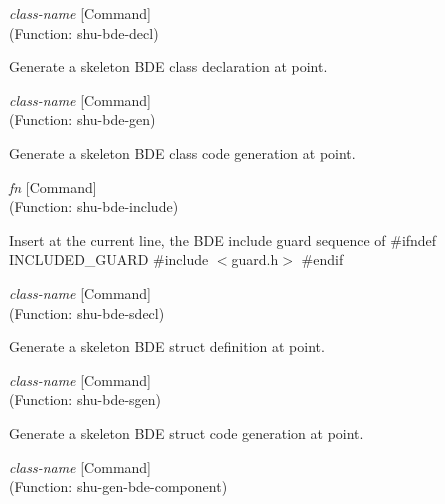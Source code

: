 \vspace{1em}
\noindent
{}
\usebox{\funcname}\emph{class-name}
 \hfill [Command]\\%
 (Function: shu-bde-decl)

\begin{doc-string}
Generate a skeleton BDE class declaration at point.
\end{doc-string}

\vspace{1em}
\noindent
{}
\usebox{\funcname}\emph{class-name}
 \hfill [Command]\\%
 (Function: shu-bde-gen)

\begin{doc-string}
Generate a skeleton BDE class code generation at point.
\end{doc-string}

\vspace{1em}
\noindent
{}
\usebox{\funcname}\emph{fn}
 \hfill [Command]\\%
 (Function: shu-bde-include)

\begin{doc-string}
Insert at the current line, the BDE include guard sequence of
\#ifndef INCLUDED\_GUARD
\#include $<$guard.h$>$
\#endif
\end{doc-string}

\vspace{1em}
\noindent
{}
\usebox{\funcname}\emph{class-name}
 \hfill [Command]\\%
 (Function: shu-bde-sdecl)

\begin{doc-string}
Generate a skeleton BDE struct definition at point.
\end{doc-string}

\vspace{1em}
\noindent
{}
\usebox{\funcname}\emph{class-name}
 \hfill [Command]\\%
 (Function: shu-bde-sgen)

\begin{doc-string}
Generate a skeleton BDE struct code generation at point.
\end{doc-string}

\vspace{1em}
\noindent
{}
\usebox{\funcname}\emph{class-name}
 \hfill [Command]\\%
 (Function: shu-gen-bde-component)


